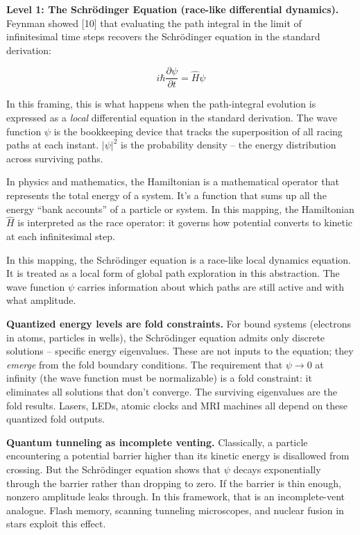 \documentclass[
  11pt,
]{article}
\begin{document}
\textbf{Level 1: The Schrödinger Equation (race-like differential
dynamics).} Feynman showed {[}10{]} that evaluating the path integral in
the limit of infinitesimal time steps recovers the Schrödinger equation
in the standard derivation:

\[
i\hbar \frac{\partial \psi}{\partial t} = \hat{H}\psi
\]

In this framing, this is what happens when the path-integral evolution
is expressed as a \emph{local} differential equation in the standard
derivation. The wave function \(\psi\) is the bookkeeping device that
tracks the superposition of all racing paths at each instant.
\(|\psi|^2\) is the probability density -- the energy distribution
across surviving paths.

In physics and mathematics, the Hamiltonian is a mathematical operator
that represents the total energy of a system. It's a function that sums
up all the energy ``bank accounts'' of a particle or system. In this
mapping, the Hamiltonian \(\hat{H}\) is interpreted as the race
operator: it governs how potential converts to kinetic at each
infinitesimal step.

In this mapping, the Schrödinger equation is a race-like local dynamics
equation. It is treated as a local form of global path exploration in
this abstraction. The wave function \(\psi\) carries information about
which paths are still active and with what amplitude.

\textbf{Quantized energy levels are fold constraints.} For bound systems
(electrons in atoms, particles in wells), the Schrödinger equation
admits only discrete solutions -- specific energy eigenvalues. These are
not inputs to the equation; they \emph{emerge} from the fold boundary
conditions. The requirement that \(\psi \to 0\) at infinity (the wave
function must be normalizable) is a fold constraint: it eliminates all
solutions that don't converge. The surviving eigenvalues are the fold
results. Lasers, LEDs, atomic clocks and MRI machines all depend on
these quantized fold outputs.

\textbf{Quantum tunneling as incomplete venting.} Classically, a
particle encountering a potential barrier higher than its kinetic energy
is disallowed from crossing. But the Schrödinger equation shows that
\(\psi\) decays exponentially through the barrier rather than dropping
to zero. If the barrier is thin enough, nonzero amplitude leaks through.
In this framework, that is an incomplete-vent analogue. Flash memory,
scanning tunneling microscopes, and nuclear fusion in stars exploit this
effect.
\end{document}
